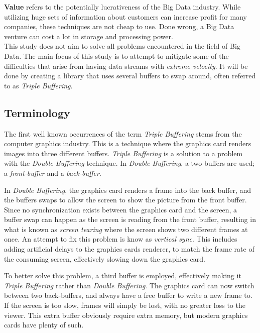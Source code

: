 \documentclass[a4paper]{article}
\begin{document}
\textbf{Value} refers to the potentially lucrativeness of the Big Data industry. While utilizing huge sets of information about customers can increase profit for many companies, these techniques are not cheap to use. Done wrong, a Big Data venture can cost a lot in storage and processing power.\\


This study does not aim to solve all problems encountered in the field of Big Data. The main focus of this study is to attempt to mitigate some of the difficulties that arise from having data streams with \textit{extreme velocity}. It will be done by creating a  library that uses several buffers to swap around, often referred to as \textit{Triple Buffering}.


\subsection{Terminology}
The first well known occurrences of the term \textit{Triple Buffering} stems from the computer graphics industry\cite{3buf}. This is a technique where the graphics card renders images into three different buffers. \textit{Triple Buffering} is a solution to a problem with the \textit{Double Buffering} technique. In \textit{Double Buffering}, a two buffers are used; a \textit{front-buffer} and a \textit{back-buffer}. 

In \textit{Double Buffering}, the graphics card renders a frame into the back buffer, and the buffers swaps to allow the screen to show the picture from the front buffer. Since no synchronization exists between the graphics card and the screen, a buffer swap can happen as the screen is reading from the front buffer, resulting in what is known as \textit{screen tearing} where the screen shows two different frames at once. An attempt to fix this problem is know as \textit{vertical sync}. This includes adding artificial delays to the graphics cards renderer, to match the frame rate of the consuming screen, effectively slowing down the graphics card.

To better solve this problem, a third buffer is employed, effectively making it \textit{Triple Buffering} rather than \textit{Double Buffering}. The graphics card can now switch between two back-buffers, and always have a free buffer to write a new frame to. If the screen is too slow, frames will simply be lost, with no greater loss to the viewer. This extra buffer obviously require extra memory, but modern graphics cards have plenty of such.\\
\end{document}

